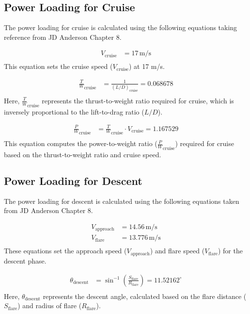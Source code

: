 \documentclass[12 pt]{article}
\begin{document}
\subsection{{Power Loading for Cruise}}

The power loading for cruise is calculated using the following equations taking reference from JD Anderson Chapter 8.

\begin{align*}
V_{\text{cruise}} &= 17 \, \text{m/s} \tag{3.17} \\
\end{align*}
This equation sets the cruise speed ($V_{\text{cruise}}$) at 17 m/s.

\begin{align*}
\frac{T}{W}_{\text{cruise}} &= \frac{1}{(L/D)_{\text{cruise}}} = 0.068678 \tag{3.18} \\
\end{align*}
Here, $\frac{T}{W}_{\text{cruise}}$ represents the thrust-to-weight ratio required for cruise, which is inversely proportional to the lift-to-drag ratio ($L/D$).

\begin{align*}
\frac{P}{W}_{\text{cruise}} &= \frac{T}{W}_{\text{cruise}} \cdot V_{\text{cruise}} = 1.167529 \tag{3.19} \\
\end{align*}
This equation computes the power-to-weight ratio ($\frac{P}{W}_{\text{cruise}}$) required for cruise based on the thrust-to-weight ratio and cruise speed.

\subsection{{Power Loading for Descent}}

The power loading for descent is calculated using the following equations taken from JD Anderson Chapter 8.

\begin{align*}
V_{\text{approach}} &= 14.56 \, \text{m/s} \tag{3.20} \\
V_{\text{flare}} &= 13.776 \, \text{m/s} \tag{3.21} \\
\end{align*}
These equations set the approach speed ($V_{\text{approach}}$) and flare speed ($V_{\text{flare}}$) for the descent phase.

\begin{align*}
\theta_{\text{descent}} &= \sin^{-1}\left(\frac{S_{\text{flare}}}{R_{\text{flare}}}\right) = 11.52162^\circ \tag{3.22} \\
\end{align*}
Here, $\theta_{\text{descent}}$ represents the descent angle, calculated based on the flare distance ($S_{\text{flare}}$) and radius of flare ($R_{\text{flare}}$).
\end{document}
